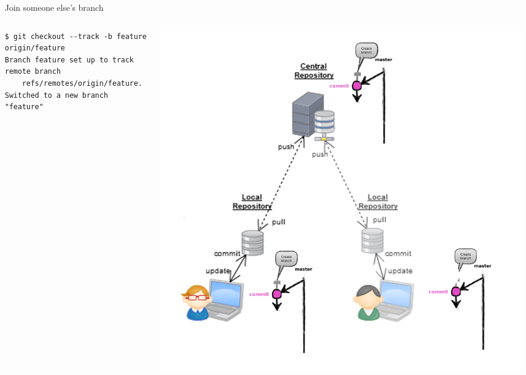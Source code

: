 \begin{frame}[fragile]{Join someone else's branch}
\begin{columns}
	\begin{column}{0.4\textwidth}
	\begin{lstlisting}
$ git checkout --track -b feature origin/feature
Branch feature set up to track remote branch 
	refs/remotes/origin/feature.
Switched to a new branch "feature"
	\end{lstlisting}
	\end{column}
	\begin{column}{0.6\textwidth}
		\begin{center}
			\includegraphics[width=.9\textwidth]{multiuser_track.png}
		\end{center}
	\end{column}
\end{columns}
\end{frame}


